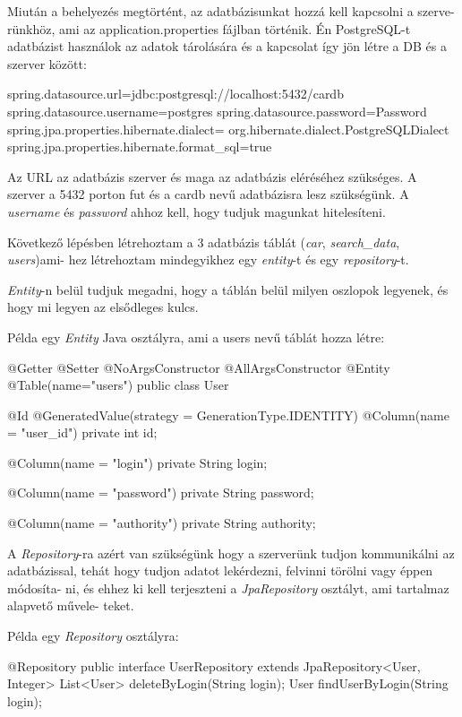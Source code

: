 Miután a behelyezés megtörtént, az adatbázisunkat hozzá kell kapcsolni a szerve-
rünkhöz, ami az application.properties fájlban történik. Én PostgreSQL-t adatbázist használok az adatok tárolására és a kapcsolat így jön létre a DB és a szerver között:

\begin{java}
spring.datasource.url=jdbc:postgresql://localhost:5432/cardb
spring.datasource.username=postgres
spring.datasource.password=Password
spring.jpa.properties.hibernate.dialect=
  org.hibernate.dialect.PostgreSQLDialect
spring.jpa.properties.hibernate.format_sql=true
\end{java}

Az URL az adatbázis szerver és maga az adatbázis eléréséhez szükséges. A szerver a 5432 porton fut és a cardb nevű adatbázisra lesz szükségünk.
A \textit{username} és \textit{password} ahhoz kell, hogy tudjuk magunkat hitelesíteni.

Következő lépésben létrehoztam a 3 adatbázis táblát (\textit{car}, \textit{search\_data}, \textit{users})ami-
hez létrehoztam mindegyikhez egy \textit{entity}-t és egy \textit{repository}-t.

\textit{Entity}-n belül tudjuk megadni, hogy a táblán belül milyen oszlopok legyenek, és hogy mi legyen az elsődleges kulcs.

Példa egy \textit{Entity} Java osztályra, ami a users nevű táblát hozza létre:

\begin{java}
@Getter
@Setter
@NoArgsConstructor
@AllArgsConstructor
@Entity
@Table(name="users")
public class User {
    @Id
    @GeneratedValue(strategy = GenerationType.IDENTITY)
    @Column(name = "user_id")
    private int id;

    @Column(name = "login")
    private String login;

    @Column(name = "password")
    private String password;

    @Column(name = "authority")
    private String authority;
}
\end{java}

A \textit{Repository}-ra azért van szükségünk hogy a szerverünk tudjon kommunikálni az adatbázissal, tehát hogy tudjon adatot lekérdezni, felvinni törölni vagy éppen módosíta-
ni, és ehhez ki kell terjeszteni a \textit{JpaRepository} osztályt, ami tartalmaz alapvető művele-
teket.

Példa egy \textit{Repository} osztályra:

\begin{java}
@Repository
public interface UserRepository
extends JpaRepository<User, Integer> {
    List<User> deleteByLogin(String login);
    User findUserByLogin(String login);
}
\end{java}
\newpage

